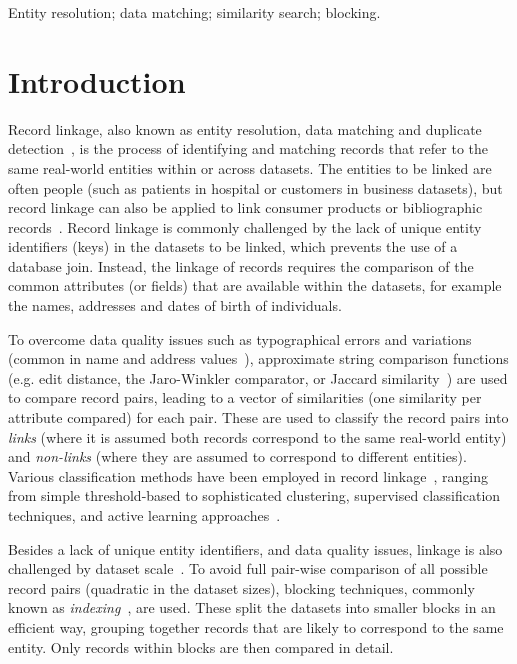 \documentclass{llncs}
\begin{document}
\keywords Entity resolution; data matching; similarity search;
         blocking.


\section{Introduction}
\label{sec-intro}

Record linkage, also known as entity resolution, data matching and
duplicate detection~\cite{Chr12}, is the process of identifying and
matching records that refer to the same real-world entities within or
across datasets. The entities to be linked are often people (such as
patients in hospital or customers in business datasets), but record
linkage can also be applied to link consumer products or bibliographic
records~\cite{Chr12}. Record linkage is commonly challenged by the lack
of unique entity identifiers (keys) in the datasets to be linked, which
prevents the use of a database join. Instead, the linkage of records
requires the comparison of the common attributes (or fields) that are
available within the datasets, for example the names, addresses and
dates of birth of individuals.

To overcome data quality issues such as typographical errors and
variations (common in name and address values~\cite{Chr12}),
approximate string comparison functions (e.g. edit distance, the
Jaro-Winkler comparator, or Jaccard similarity~\cite{Chr12}) are used to
compare record pairs, leading to a vector of similarities (one
similarity per attribute compared) for each pair. These
are used to classify the record pairs into
\emph{links} (where it is assumed both records correspond to
the same real-world entity) and \emph{non-links} (where they are
assumed to correspond to different entities). Various
classification methods have been employed in record
linkage~\cite{Chr12,Don15}, ranging from simple threshold-based to
sophisticated clustering, supervised classification techniques, and
active learning approaches~\cite{Wan15}.

Besides a lack of unique entity identifiers, and data
quality issues, linkage is also
challenged by dataset scale~\cite{Don15}. To avoid full pair-wise comparison of all possible
record pairs (quadratic in the dataset sizes),
blocking techniques, commonly known as \emph{indexing}~\cite{Chr12b},
are used. These split the datasets into smaller blocks in an efficient way, grouping together records that are likely to
correspond to the same entity. Only
records within blocks are then compared in detail.
\end{document}
